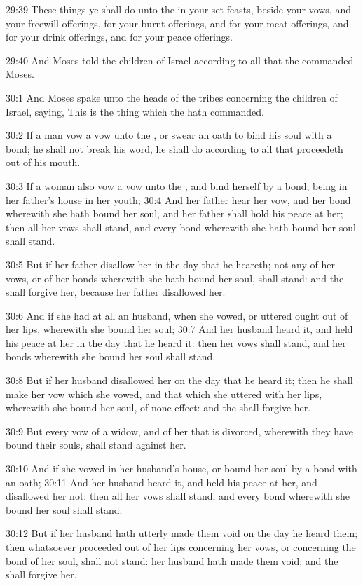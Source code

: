 29:39 These things ye shall do unto the \LORD in your set feasts,
beside your vows, and your freewill offerings, for your burnt
offerings, and for your meat offerings, and for your drink offerings,
and for your peace offerings.

29:40 And Moses told the children of Israel according to all that the
\LORD commanded Moses.

30:1 And Moses spake unto the heads of the tribes concerning the
children of Israel, saying, This is the thing which the \LORD hath
commanded.

30:2 If a man vow a vow unto the \LORD, or swear an oath to bind his
soul with a bond; he shall not break his word, he shall do according
to all that proceedeth out of his mouth.

30:3 If a woman also vow a vow unto the \LORD, and bind herself by a
bond, being in her father's house in her youth; 30:4 And her father
hear her vow, and her bond wherewith she hath bound her soul, and her
father shall hold his peace at her; then all her vows shall stand, and
every bond wherewith she hath bound her soul shall stand.

30:5 But if her father disallow her in the day that he heareth; not
any of her vows, or of her bonds wherewith she hath bound her soul,
shall stand: and the \LORD shall forgive her, because her father
disallowed her.

30:6 And if she had at all an husband, when she vowed, or uttered
ought out of her lips, wherewith she bound her soul; 30:7 And her
husband heard it, and held his peace at her in the day that he heard
it: then her vows shall stand, and her bonds wherewith she bound her
soul shall stand.

30:8 But if her husband disallowed her on the day that he heard it;
then he shall make her vow which she vowed, and that which she uttered
with her lips, wherewith she bound her soul, of none effect: and the
\LORD shall forgive her.

30:9 But every vow of a widow, and of her that is divorced, wherewith
they have bound their souls, shall stand against her.

30:10 And if she vowed in her husband's house, or bound her soul by a
bond with an oath; 30:11 And her husband heard it, and held his peace
at her, and disallowed her not: then all her vows shall stand, and
every bond wherewith she bound her soul shall stand.

30:12 But if her husband hath utterly made them void on the day he
heard them; then whatsoever proceeded out of her lips concerning her
vows, or concerning the bond of her soul, shall not stand: her husband
hath made them void; and the \LORD shall forgive her.

